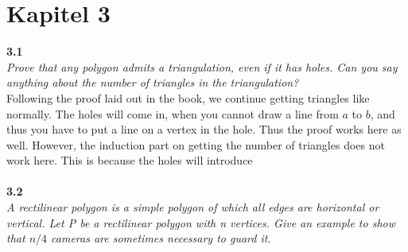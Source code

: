 \section{Kapitel 3}
\noindent
\textbf{3.1}\\
\noindent
\textit{Prove that any polygon admits a triangulation, even if it has holes. Can you say anything about the number of triangles in the triangulation?}\\
Following the proof laid out in the book, we continue getting triangles like normally. The holes will come in, when you cannot draw a line from $a$ to $b$, and thus you have to put a line on a vertex in the hole. Thus the proof works here as well. However, the induction part on getting the number of triangles does not work here. This is because the holes will introduce
\\\\
\noindent
\textbf{3.2}\\
\noindent
\textit{A rectilinear polygon is a simple polygon of which all edges are horizontal or vertical. Let P be a rectilinear polygon with n vertices. Give an example to show that $n/4$ cameras are sometimes necessary to guard it.}
\begin{figure}[!ht]
	\centering

	\label{fig:my_label}
\end{figure}

